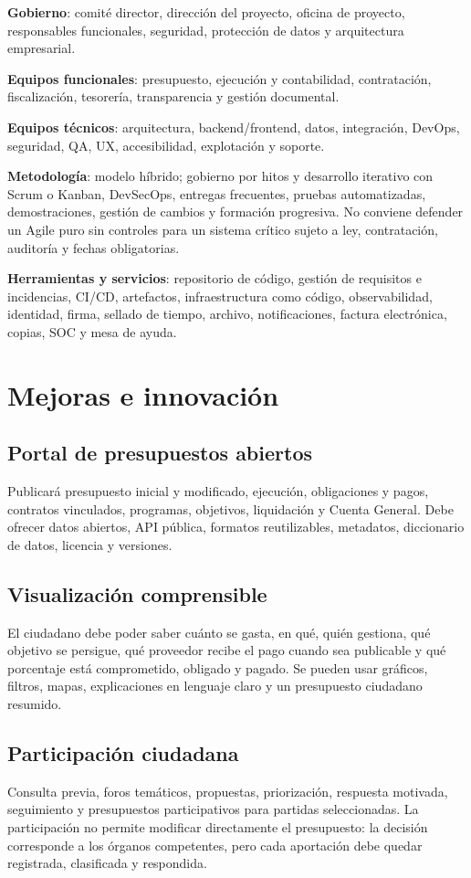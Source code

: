 \documentclass[11pt,a4paper]{article}
\begin{document}
\textbf{Gobierno}: comité director, dirección del proyecto, oficina de proyecto, responsables funcionales, seguridad, protección de datos y arquitectura empresarial.

\textbf{Equipos funcionales}: presupuesto, ejecución y contabilidad, contratación, fiscalización, tesorería, transparencia y gestión documental.

\textbf{Equipos técnicos}: arquitectura, backend/frontend, datos, integración, DevOps, seguridad, QA, UX, accesibilidad, explotación y soporte.

\textbf{Metodología}: modelo híbrido; gobierno por hitos y desarrollo iterativo con Scrum o Kanban, DevSecOps, entregas frecuentes, pruebas automatizadas, demostraciones, gestión de cambios y formación progresiva. No conviene defender un Agile puro sin controles para un sistema crítico sujeto a ley, contratación, auditoría y fechas obligatorias.

\textbf{Herramientas y servicios}: repositorio de código, gestión de requisitos e incidencias, CI/CD, artefactos, infraestructura como código, observabilidad, identidad, firma, sellado de tiempo, archivo, notificaciones, factura electrónica, copias, SOC y mesa de ayuda.

\section{Mejoras e innovación}

\subsection{Portal de presupuestos abiertos}
Publicará presupuesto inicial y modificado, ejecución, obligaciones y pagos, contratos vinculados, programas, objetivos, liquidación y Cuenta General. Debe ofrecer datos abiertos, API pública, formatos reutilizables, metadatos, diccionario de datos, licencia y versiones.

\subsection{Visualización comprensible}
El ciudadano debe poder saber cuánto se gasta, en qué, quién gestiona, qué objetivo se persigue, qué proveedor recibe el pago cuando sea publicable y qué porcentaje está comprometido, obligado y pagado. Se pueden usar gráficos, filtros, mapas, explicaciones en lenguaje claro y un presupuesto ciudadano resumido.

\subsection{Participación ciudadana}
Consulta previa, foros temáticos, propuestas, priorización, respuesta motivada, seguimiento y presupuestos participativos para partidas seleccionadas. La participación no permite modificar directamente el presupuesto: la decisión corresponde a los órganos competentes, pero cada aportación debe quedar registrada, clasificada y respondida.
\end{document}
